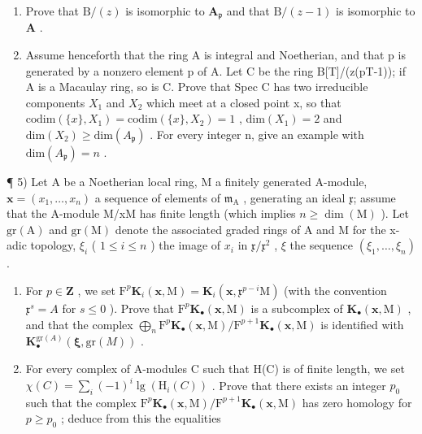 \begin{enumerate}
\def\labelenumi{\alph{enumi})}
\item
  Prove that \(\mathrm{B} / (z)\) is isomorphic to \(\mathbf{A}_{\mathfrak{p}}\) and that \(\mathrm{B} / (z - 1)\) is isomorphic to \(\mathbf{A}\) .
\item
  Assume henceforth that the ring A is integral and Noetherian, and that p is generated by a nonzero element p of A. Let C be the ring B{[}T{]}/(z(pT-1)); if A is a Macaulay ring, so is C. Prove that Spec C has two irreducible components \(X_{1}\) and \(X_{2}\) which meet at a closed point x, so that \(\text{codim}(\{x\}, X_{1}) = \text{codim}(\{x\}, X_{2}) = 1\) , \(\text{dim}(X_{1}) = 2\) and \(\text{dim}(X_{2}) \geqslant \text{dim}(A_{\mathfrak{p}})\) . For every integer n, give an example with \(\text{dim}(A_{\mathfrak{p}}) = n\) .
\end{enumerate}

¶ 5) Let A be a Noetherian local ring, M a finitely generated A-module, \(\mathbf{x} = (x_{1},\ldots ,x_{n})\) a sequence of elements of \(\mathfrak{m}_{\mathrm{A}}\) , generating an ideal \(\mathfrak{x}\); assume that the A-module M/xM has finite length (which implies \(n\geqslant \dim (\mathrm{M})\) ). Let \(\mathrm{gr(A)}\) and \(\mathrm{gr(M)}\) denote the associated graded rings of A and M for the x-adic topology, \(\xi_{i}\) ( \(1\leqslant i\leqslant n\) ) the image of \(x_{i}\) in \(\mathfrak{x} / \mathfrak{x}^{2}\) , \(\xi\) the sequence \((\xi_1,\dots ,\xi_n)\) .

\begin{enumerate}
\def\labelenumi{\alph{enumi})}
\item
  For \(p \in \mathbf{Z}\) , we set \(\mathrm{F}^p\mathbf{K}_i(\mathbf{x},\mathrm{M}) = \mathbf{K}_i(\mathbf{x},\mathfrak{x}^{p - i}\mathrm{M})\) (with the convention \(\mathfrak{x}^s = A\) for \(s \leqslant 0\) ). Prove that \(\mathrm{F}^p\mathbf{K}_{\bullet}(\mathbf{x},\mathrm{M})\) is a subcomplex of \(\mathbf{K}_{\bullet}(\mathbf{x},\mathrm{M})\) , and that the complex \(\bigoplus_{n}\mathrm{F}^p\mathbf{K}_{\bullet}(\mathbf{x},\mathrm{M}) / \mathrm{F}^{p + 1}\mathbf{K}_{\bullet}(\mathbf{x},\mathrm{M})\) is identified with \(\mathbf{K}_{\bullet}^{\mathrm{gr}(A)}(\boldsymbol {\xi},\mathrm{gr}(M))\) .
\item
  For every complex of A-modules C such that H(C) is of finite length, we set \(\chi(C) = \sum_{i}(-1)^{i}\lg(\mathrm{H}_{i}(C))\) . Prove that there exists an integer \(p_0\) such that the complex \(\mathrm{F}^{p}\mathbf{K}_{\bullet}(\mathbf{x},\mathrm{M}) / \mathrm{F}^{p + 1}\mathbf{K}_{\bullet}(\mathbf{x},\mathrm{M})\) has zero homology for \(p\geqslant p_0\) ; deduce from this the equalities
\end{enumerate}


